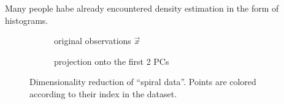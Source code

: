 Many people habe already encountered density estimation in the form of histograms.

\begin{frame}
\end{frame}

\begin{frame}

\begin{figure}[ht]
     \centering
     \begin{subfigure}[t]{0.4\textwidth}
         \centering
         \usebox{\imagebox}%
         \caption{original observations $\vec x$}
         \label{fig:spiral_data}
     \end{subfigure}
     \hfill
     \begin{subfigure}[t]{0.35\textwidth}
         \centering
         \caption{projection onto the first 2 PCs}
         \label{fig:spiral_pca}
     \end{subfigure}
     \caption{Dimensionality reduction of ``spiral data''. Points are colored according to their index in the dataset.}
	 \label{fig:spiral}
\end{figure}

\end{frame}

